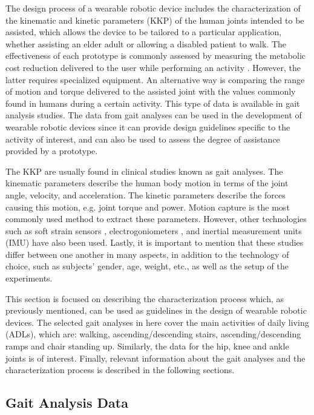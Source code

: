 The design process of a wearable robotic device includes the characterization of the kinematic and kinetic parameters (KKP) of the human joints intended to be assisted, which allows the device to be tailored to a particular application, whether assisting an elder adult or allowing a disabled patient to walk. The effectiveness of each prototype is commonly assessed by measuring the metabolic cost reduction delivered to the user while performing an activity \cite{panizzolo2016biologically}. However, the latter requires specialized equipment. An alternative way is comparing the range of motion and torque delivered to the assisted joint with the values commonly found in humans during a certain activity. This type of data is available in gait analysis studies. The data from gait analyses can be used in the development of wearable robotic devices since it can provide design guidelines specific to the activity of interest, and can also be used to assess the degree of assistance provided by a prototype.

The KKP are usually found in clinical studies known as gait analyses. The kinematic parameters describe the human body motion in terms of the joint angle, velocity, and acceleration. The kinetic
parameters describe the forces causing this motion, e.g. joint torque and power. Motion capture is the most commonly used method to extract these parameters. However, other technologies such as soft strain sensors \cite{mengucc2014wearable}, electrogoniometers \cite{wu2011electromyography}, and inertial measurement units (IMU) have also been used. Lastly, it is important to mention that these studies differ between one another in many aspects, in addition to the technology of choice, such as subjects' gender, age, weight, etc., as well as the setup of the experiments.

This section is focused on describing the characterization process which, as previously mentioned, can be used as guidelines in the design of wearable robotic devices. The selected gait analyses in here cover the main activities of daily living (ADLs), which are: walking, ascending/descending stairs, ascending/descending ramps and chair standing up. Similarly, the data for the hip, knee and ankle joints is of interest. Finally, relevant information about the gait analyses and the characterization process is described in the following sections.

\subsection{Gait Analysis Data}

